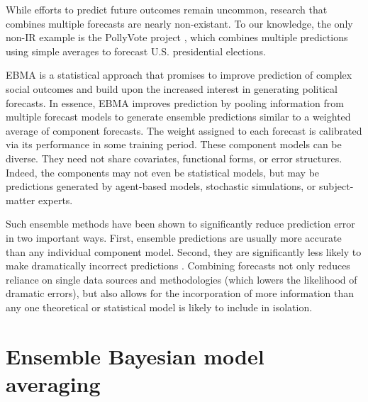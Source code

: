\documentclass[pdftex,12pt,fullpage,oneside]{amsart}
\begin{document}
While efforts to predict future outcomes remain uncommon, research
that combines multiple forecasts are nearly non-existant.  To our
knowledge, the only non-IR example is the PollyVote project
\citep[c.f.][]{Graefe:2010}, which combines multiple predictions using
simple averages to forecast U.S. presidential elections.

EBMA is a statistical approach that promises to improve prediction of
complex social outcomes and build upon the increased interest in
generating political forecasts. In essence, EBMA improves prediction
by pooling information from multiple forecast models to generate
ensemble predictions similar to a weighted average of component
forecasts. The weight assigned to each forecast is calibrated via its
performance in some training period.  These component models can be diverse.  They need not
share covariates, functional forms, or error structures. Indeed, the
components may not even be statistical models, but may be predictions
generated by agent-based models, stochastic simulations, or
subject-matter experts.



Such ensemble methods have been shown to significantly reduce
prediction error in two important ways.  First, ensemble predictions
are usually more accurate than any individual component model. Second,
they are significantly less likely to make dramatically incorrect
predictions \citep{Bates:1969, Armstrong:2001, Raftery:2005}.
Combining forecasts not only reduces reliance on single data sources
and methodologies (which lowers the likelihood of dramatic errors),
but also allows for the incorporation of more information than any one
theoretical or statistical model is likely to include in isolation.


\setcounter{section}{1}

\section{Ensemble Bayesian model averaging} 
\end{document}
